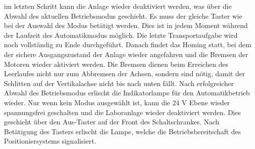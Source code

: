 \documentclass[../Bachelorarbeit.tex]{subfiles}
\begin{document}
im letzten Schritt kann die Anlage wieder deaktiviert werden, was über die Abwahl des aktuellen Betriebsmodus geschieht. Es muss der gleiche Taster wie bei der Auswahl des Modus betätigt werden. Dies ist in jedem Moment während der Laufzeit des Automatikmodus möglich. Die letzte Transportaufgabe wird noch vollständig zu Ende durchgeführt. Danach findet das Homing statt, bei dem der sichere Ausgangszustand der Anlage wieder angefahren und die Bremsen der Motoren wieder aktiviert werden. Die Bremsen dienen beim Erreichen des Leerlaufes nicht nur zum Abbremsen der Achsen, sondern sind nötig, damit der Schlitten auf der Vertikalachse nicht bis nach unten fällt. Nach erfolgreicher Abwahl des Betriebsmodus erlischt die Indikatorlampe für den Automatikbetrieb wieder. Nur wenn kein Modus ausgewählt ist, kann die 24 V Ebene wieder spannungsfrei geschalten und die Laboranlage wieder deaktiviert werden. Dies geschieht über den Aus-Taster auf der Front des Schaltschrankes. Nach Betätigung des Tasters erlischt die Lampe, welche die Betriebsbereitschaft des Positioniersystems signalisiert.\\
\end{document}
